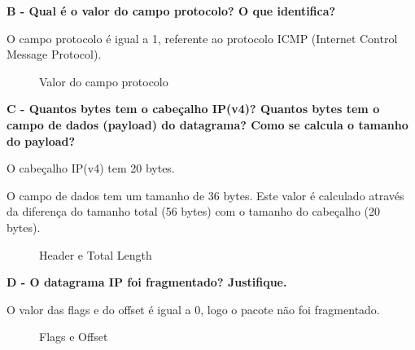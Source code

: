 \documentclass[11pt]{article}
\begin{document}
\vspace{0.5cm}

\textbf{B - Qual é o valor do campo protocolo? O que identifica?}

O campo protocolo é igual a 1, referente ao protocolo ICMP (Internet Control Message Protocol).

\begin{figure}[hbt!]
    \centering
    \caption{Valor do campo protocolo}
\end{figure}

\clearpage

\textbf{C - Quantos bytes tem o cabeçalho IP(v4)? Quantos bytes tem o campo de dados (payload) do datagrama? Como se calcula o tamanho do payload?}

O cabeçalho IP(v4) tem 20 bytes.

O campo de dados tem um tamanho de 36 bytes. Este valor é calculado através da diferença do tamanho total (56 bytes) com o tamanho do cabeçalho (20 bytes).

\begin{figure}[hbt!]
    \centering
    \caption{Header e Total Length}
\end{figure}

\vspace{0.5cm}

\textbf{D - O datagrama IP foi fragmentado? Justifique.}

O valor das flags e do offset é igual a 0, logo o pacote não foi fragmentado.

\begin{figure}[hbt!]
    \centering
    \caption{Flags e Offset}
\end{figure}
\end{document}
